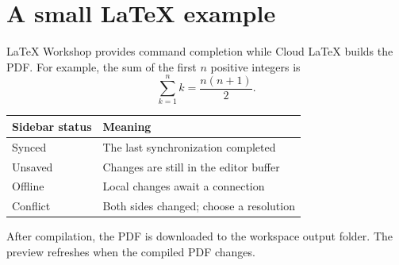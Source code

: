 \section{A small LaTeX example}

LaTeX Workshop provides command completion while Cloud LaTeX builds the PDF.
For example, the sum of the first $n$ positive integers is
\begin{equation}
  \sum_{k=1}^{n} k = \frac{n(n+1)}{2}.
\end{equation}

\begin{center}
  \begin{tabular}{ll}
    Sidebar status & Meaning \\
    \hline
    Synced & The last synchronization completed \\
    Unsaved & Changes are still in the editor buffer \\
    Offline & Local changes await a connection \\
    Conflict & Both sides changed; choose a resolution \\
  \end{tabular}
\end{center}

After compilation, the PDF is downloaded to the workspace output folder.
The preview refreshes when the compiled PDF changes.
